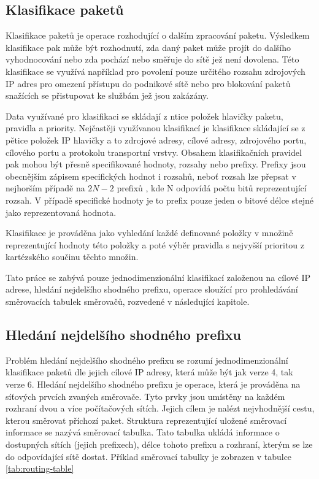 \subsection{Klasifikace paketů}

Klasifikace paketů je operace rozhodující o dalším zpracování paketu.
Výsledkem klasifikace pak může být rozhodnutí, zda daný paket může projít do
dalšího vyhodnocování nebo zda pochází nebo směřuje do sítě jež není dovolena.
Této klasifikace se využívá například pro povolení pouze určitého rozsahu zdrojových IP adres
pro omezení přístupu do podnikové sítě nebo pro blokování paketů snažících se přistupovat
ke službám jež jsou zakázány.

Data využívané pro klasifikaci se skládají z ntice položek hlavičky paketu, pravidla a priority.
Nejčastěji využívanou klasifikací je klasifikace skládající se z pětice položek IP hlavičky
a to zdrojové adresy, cílové adresy, zdrojového portu, cílového portu a protokolu transportní vrstvy.
Obsahem klasifikačních pravidel pak mohou být přesně specifikované hodnoty, rozsahy nebo prefixy.
Prefixy jsou obecnějším zápisem specifických hodnot i rozsahů, neboť rozsah lze přepsat v nejhorším
případě na $2N - 2$ prefixů \cite{clasification-prefix}, kde N odpovídá počtu bitů reprezentující rozsah. V případě specifické hodnoty
je to prefix pouze jeden o bitové délce stejné jako reprezentovaná hodnota.

Klasifikace je prováděna jako vyhledání každé definované položky v množině reprezentující hodnoty
této položky a poté výběr pravidla s nejvyšší prioritou z kartézského součinu těchto množin.

Tato práce se zabývá pouze jednodimenzionální klasifikací založenou na cílové IP adrese, hledání
nejdelšího shodného prefixu, operace sloužící pro prohledávání směrovacích tabulek směrovačů,
rozvedené v následující kapitole.

\subsection{Hledání nejdelšího shodného prefixu}\label{section:lpm} %
Problém hledání nejdelšího shodného prefixu se rozumí jednodimenzionální klasifikace paketů dle
jejich cílové IP adresy, která může být jak verze 4, tak verze 6.
Hledání nejdelšího shodného prefixu je operace, která je prováděna
na síťových prvcích zvaných směrovače. Tyto prvky jsou umístěny na každém rozhraní dvou a více
počítačových sítích. Jejich cílem je nalézt nejvhodnější cestu, kterou směrovat příchozí paket.
Struktura reprezentující uložené směrovací informace se nazývá směrovací tabulka.
Tato tabulka ukládá informace o dostupných sítích (jejich prefixech), délce tohoto prefixu a rozhraní,
kterým se lze do odpovídající sítě dostat. Příklad směrovací tabulky je zobrazen v tabulce \ref{tab:routing-table}

